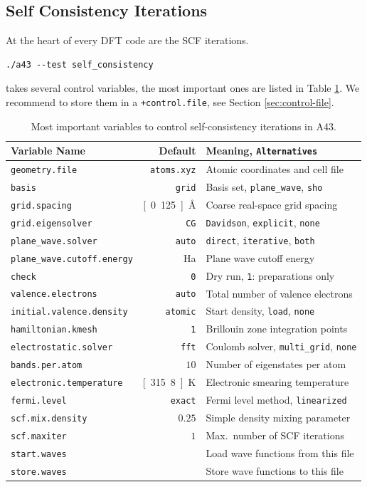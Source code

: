 \documentclass[oribibl]{llncs}
\newcommand{\ttt}[1]{\texttt{#1}}
\newcommand{\codename}{A43}
\begin{document}
\subsection{Self Consistency Iterations} \label{sec:self-consistency}
%
At the heart of every \ac{DFT} code are the \ac{SCF} iterations.
\begin{verbatim}
./a43 --test self_consistency
\end{verbatim}
takes several control variables, the most important ones are listed in Table \ref{tab:main-scf-variables}.
We recommend to store them in a \ttt{+control.file}, see Section \ref{sec:control-file}.
%
\begin{table}[h]
\caption[Main Variables]{
Most important variables to control self-consistency iterations in \codename{}.
} \label{tab:main-scf-variables}
\centering
\begin{tabular}{|l|r|l|}
\hline
  Variable Name & Default & Meaning, \ttt{Alternatives} \\
\hline
  \ttt{geometry.file} & \ttt{atoms.xyz}   & Atomic coordinates and cell file \\
  \ttt{basis}         & \ttt{grid}        & Basis set, \ttt{plane\_wave}, \ttt{sho} \\ 
  \ttt{grid.spacing}  & \unit[0.125]{\AA} & Coarse real-space grid spacing \\
  \ttt{grid.eigensolver} & \ttt{CG}       & \ttt{Davidson}, \ttt{explicit}, \ttt{none} \\
  \ttt{plane\_wave.solver} & \ttt{auto}   & \ttt{direct}, \ttt{iterative}, \ttt{both} \\ 
  \ttt{plane\_wave.cutoff.energy} & \unit[11]{Ha} & Plane wave cutoff energy \\
  \ttt{check}         & \ttt{0}           & Dry run, \ttt{1}: preparations only \\
  \ttt{valence.electrons} & \ttt{auto}    & Total number of valence electrons \\
  \ttt{initial.valence.density} & \ttt{atomic} & Start density, \ttt{load}, \ttt{none} \\
  \ttt{hamiltonian.kmesh} & \ttt{1}       & Brillouin zone integration points \\
  \ttt{electrostatic.solver} & \ttt{fft}  & Coulomb solver, \ttt{multi\_grid}, \ttt{none} \\
  \ttt{bands.per.atom} & $10$ 			  & Number of eigenstates per atom \\
  \ttt{electronic.temperature} & \unit[315.8]{K} & Electronic smearing temperature \\
  \ttt{fermi.level}   & \ttt{exact}       & Fermi level method, \ttt{linearized} \\
  \ttt{scf.mix.density} & $0.25$          & Simple density mixing parameter \\
  \ttt{scf.maxiter}   & $1$               & Max.~number of \ac{SCF} iterations \\
  \ttt{start.waves}   &                   & Load wave functions from this file \\
  \ttt{store.waves}   &                   & Store wave functions to this file \\
\hline
\end{tabular}
\end{table}
\end{document}
